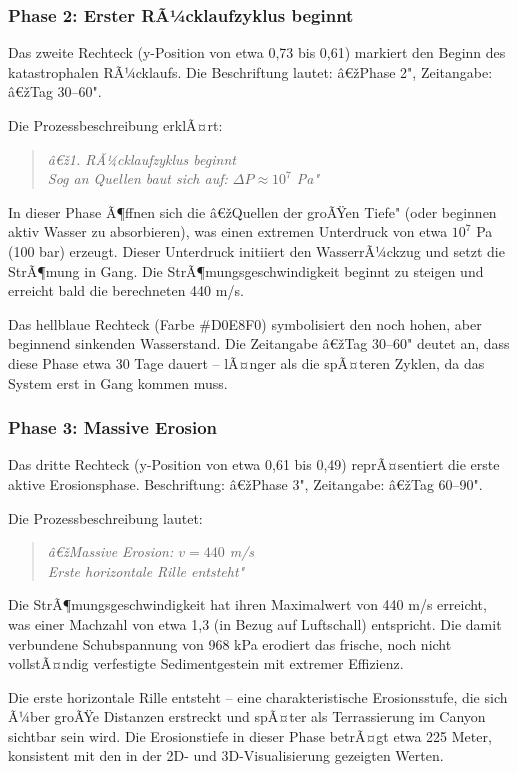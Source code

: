 \subsubsection*{Phase 2: Erster RÃ¼cklaufzyklus beginnt}

Das zweite Rechteck (y-Position von etwa 0,73 bis 0,61) markiert den Beginn des katastrophalen RÃ¼cklaufs. Die Beschriftung lautet: â€žPhase 2", Zeitangabe: â€žTag 30--60".

Die Prozessbeschreibung erklÃ¤rt:
\begin{quote}
\textit{â€ž1. RÃ¼cklaufzyklus beginnt\\
Sog an Quellen baut sich auf: $\Delta P \approx 10^7$ Pa"}
\end{quote}

In dieser Phase Ã¶ffnen sich die â€žQuellen der groÃŸen Tiefe" (oder beginnen aktiv Wasser zu absorbieren), was einen extremen Unterdruck von etwa $10^7$ Pa (100 bar) erzeugt. Dieser Unterdruck initiiert den WasserrÃ¼ckzug und setzt die StrÃ¶mung in Gang. Die StrÃ¶mungsgeschwindigkeit beginnt zu steigen und erreicht bald die berechneten 440 m/s.

Das hellblaue Rechteck (Farbe \#D0E8F0) symbolisiert den noch hohen, aber beginnend sinkenden Wasserstand. Die Zeitangabe â€žTag 30--60" deutet an, dass diese Phase etwa 30 Tage dauert -- lÃ¤nger als die spÃ¤teren Zyklen, da das System erst in Gang kommen muss.

\subsubsection*{Phase 3: Massive Erosion}

Das dritte Rechteck (y-Position von etwa 0,61 bis 0,49) reprÃ¤sentiert die erste aktive Erosionsphase. Beschriftung: â€žPhase 3", Zeitangabe: â€žTag 60--90".

Die Prozessbeschreibung lautet:
\begin{quote}
\textit{â€žMassive Erosion: $v = 440$ m/s\\
Erste horizontale Rille entsteht"}
\end{quote}

Die StrÃ¶mungsgeschwindigkeit hat ihren Maximalwert von 440 m/s erreicht, was einer Machzahl von etwa 1,3 (in Bezug auf Luftschall) entspricht. Die damit verbundene Schubspannung von 968 kPa erodiert das frische, noch nicht vollstÃ¤ndig verfestigte Sedimentgestein mit extremer Effizienz.

Die erste horizontale Rille entsteht -- eine charakteristische Erosionsstufe, die sich Ã¼ber groÃŸe Distanzen erstreckt und spÃ¤ter als Terrassierung im Canyon sichtbar sein wird. Die Erosionstiefe in dieser Phase betrÃ¤gt etwa 225 Meter, konsistent mit den in der 2D- und 3D-Visualisierung gezeigten Werten.


